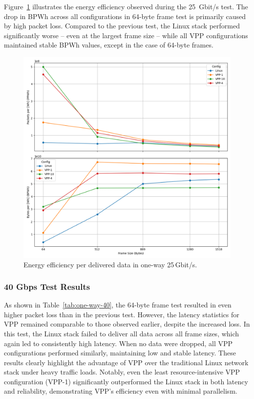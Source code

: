 Figure~\ref{fig:25g} illustrates the energy efficiency observed during the 25~Gbit/s test.
The drop in BPWh across all configurations in 64-byte frame test is primarily caused by high packet loss.
Compared to the previous test, the Linux stack performed significantly worse -- even at the largest frame size -- while all VPP configurations maintained stable BPWh values, 
except in the case of 64-byte frames.

\begin{figure}[!htbp]
    \centering
    \includegraphics[width=\linewidth]{images/consumption-25g.png}
    \caption{Energy efficiency per delivered data in one-way 25\,Gbit/s.}
    \label{fig:25g}
\end{figure}


\subsubsection{40 Gbps Test Results}

As shown in Table~\ref{tab:one-way-40}, the 64-byte frame test resulted in even higher packet loss than in the previous test.
However, the latency statistics for VPP remained comparable to those observed earlier, despite the increased loss.
In this test, the Linux stack failed to deliver all data across all frame sizes, which again led to consistently high latency.
When no data were dropped, all VPP configurations performed similarly, maintaining low and stable latency.
These results clearly highlight the advantage of VPP over the traditional Linux network stack under heavy traffic loads.
Notably, even the least resource-intensive VPP configuration (VPP-1) significantly outperformed the Linux stack in both latency and reliability, demonstrating VPP’s efficiency even with minimal parallelism.

